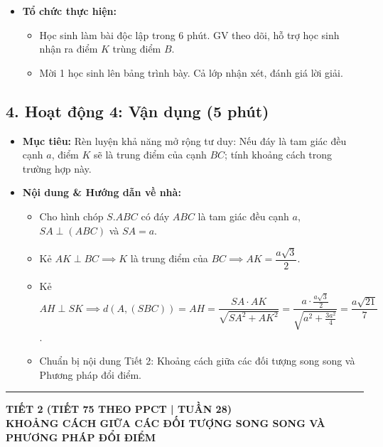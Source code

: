 \documentclass[12pt, a4paper]{article}
\begin{document}
\begin{itemize}[leftmargin=1.2cm]
    \item[d)] \textbf{Tổ chức thực hiện:}
    \begin{itemize}[leftmargin=0.6cm]
        \item Học sinh làm bài độc lập trong 6 phút. GV theo dõi, hỗ trợ học sinh nhận ra điểm $K$ trùng điểm $B$.
        \item Mời 1 học sinh lên bảng trình bày. Cả lớp nhận xét, đánh giá lời giải.
    \end{itemize}
\end{itemize}

\subsection*{4. Hoạt động 4: Vận dụng (5 phút)}

\begin{itemize}[leftmargin=1.2cm]
    \item[a)] \textbf{Mục tiêu:} Rèn luyện khả năng mở rộng tư duy: Nếu đáy là tam giác đều cạnh $a$, điểm $K$ sẽ là trung điểm của cạnh $BC$; tính khoảng cách trong trường hợp này.
    \item[b)] \textbf{Nội dung & Hướng dẫn về nhà:}
    \begin{itemize}[leftmargin=0.6cm]
        \item Cho hình chóp $S.ABC$ có đáy $ABC$ là tam giác đều cạnh $a$, $SA \perp (ABC)$ và $SA = a$.
        \item Kẻ $AK \perp BC \implies K$ là trung điểm của $BC \implies AK = \dfrac{a\sqrt{3}}{2}$.
        \item Kẻ $AH \perp SK \implies d(A, (SBC)) = AH = \dfrac{SA \cdot AK}{\sqrt{SA^2 + AK^2}} = \dfrac{a \cdot \frac{a\sqrt{3}}{2}}{\sqrt{a^2 + \frac{3a^2}{4}}} = \dfrac{a\sqrt{21}}{7}$.
        \item Chuẩn bị nội dung Tiết 2: Khoảng cách giữa các đối tượng song song và Phương pháp đổi điểm.
    \end{itemize}
\end{itemize}

\vspace{10pt}
\hrule
\vspace{10pt}

\begin{center}
    \textbf{\large TIẾT 2 (TIẾT 75 THEO PPCT | TUẦN 28)}\\[4pt]
    \textbf{\large KHOẢNG CÁCH GIỮA CÁC ĐỐI TƯỢNG SONG SONG VÀ PHƯƠNG PHÁP ĐỔI ĐIỂM}
\end{center}
\end{document}

